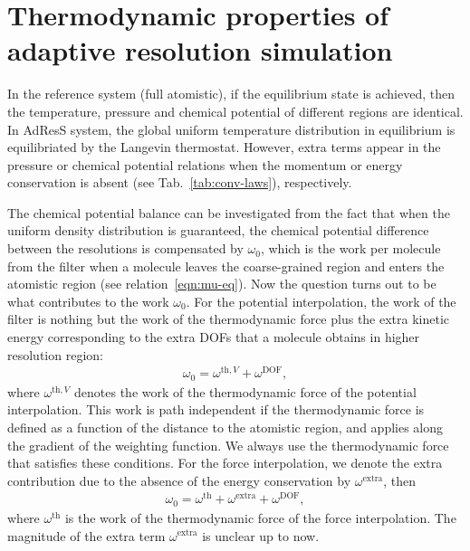 \documentclass[epjST]{svjour}
\newcommand{\thf}{{\textrm{th}}}
\newcommand{\dof}{{\textrm{DOF}}}
\newcommand{\exc}{{\textrm{extra}}}
\begin{document}
      



\section{Thermodynamic properties of adaptive resolution simulation}
\label{sec:thermodynamic}

In the reference system (full atomistic), if the equilibrium state is achieved, then
the temperature, pressure and chemical potential of different regions are identical.
In AdResS system, the global uniform
temperature distribution in equilibrium is equilibriated by the Langevin
thermostat.  However, extra terms appear in the pressure or chemical
potential relations when the momentum or energy conservation is absent
(see Tab.~\ref{tab:conv-laws}), respectively.

The chemical potential balance can be investigated from the fact that
when the uniform density distribution is guaranteed, the chemical potential
difference between the resolutions is compensated by $\omega_0$, which
is the work per molecule from the filter when a molecule leaves the
coarse-grained region and enters the atomistic region (see
relation~\eqref{eqn:mu-eq}).  Now the question turns out to be what
contributes to the work $\omega_0$.  For the potential interpolation,
the work of the filter is nothing but the work of the thermodynamic
force plus the extra kinetic energy corresponding to the extra DOFs
that a molecule obtains in higher resolution region:
\begin{align}\label{eqn:mu0-v}
  \omega_0 = \omega^{\thf,V} + \omega^\dof,
\end{align}
where $ \omega^{\thf,V}$ denotes the work of the thermodynamic force
of the potential interpolation.
This work is path independent if the thermodynamic force is defined as a function of the distance to the atomistic region, and applies along the gradient of the weighting function.
We always use the thermodynamic force that satisfies these conditions.
For the force interpolation, 
we denote the extra contribution due to the absence of the energy conservation
by $\omega^\exc$, then
\begin{align}\label{eqn:mu0-f}
  \omega_0 = \omega^{\thf} + \omega^\exc + \omega^\dof,
\end{align}
where $\omega^{\thf}$ is the work of the thermodynamic force of the force interpolation.
The magnitude of the extra term $\omega^\exc$ is unclear up to now.
\end{document}
